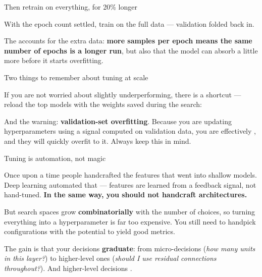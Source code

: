 \documentclass[aspectratio=169,11pt,t]{beamer}
\begin{document}
\begin{frame}[shrink=25]{Then retrain on everything, for 20\% longer}
{\fontsize{9.4}{12.6}\selectfont\color{fg2}With the epoch count settled, train on the full data --- validation folded back in.\par}\vskip 4pt
{\fontsize{9.4}{12.6}\selectfont\color{fg2}The  accounts for the extra data: \textbf{more samples per epoch means the same number of epochs is a longer run}, but also that the model can absorb a little more before it starts overfitting.\par}\vskip 4pt
\end{frame}

\begin{frame}[shrink=25]{Two things to remember about tuning at scale}
{\fontsize{9.4}{12.6}\selectfont\color{fg2}If you are not worried about slightly underperforming, there is a shortcut --- reload the top models with the weights saved during the search:\par}\vskip 4pt
\begin{iband}[rose]
And the warning: \textbf{validation-set overfitting}. Because you are updating hyperparameters using a signal computed on validation data, you are effectively , and they will quickly overfit to it. Always keep this in mind.
\end{iband}
\end{frame}

\begin{frame}[shrink=25]{Tuning is automation, not magic}
{\fontsize{9.4}{12.6}\selectfont\color{fg2}Once upon a time people handcrafted the features that went into shallow models. Deep learning automated that --- features are learned from a feedback signal, not hand-tuned. \textbf{In the same way, you should not handcraft architectures.}\par}\vskip 4pt
{\fontsize{9.4}{12.6}\selectfont\color{fg2}But search spaces grow \textbf{combinatorially} with the number of choices, so turning everything into a hyperparameter is far too expensive. You still need to handpick configurations with the potential to yield good metrics.\par}\vskip 4pt
\begin{iband}[signal]
The gain is that your decisions \textbf{graduate}: from micro-decisions (\textit{how many units in this layer?}) to higher-level ones (\textit{should I use residual connections throughout?}). And higher-level decisions .
\end{iband}
\end{frame}
\end{document}
